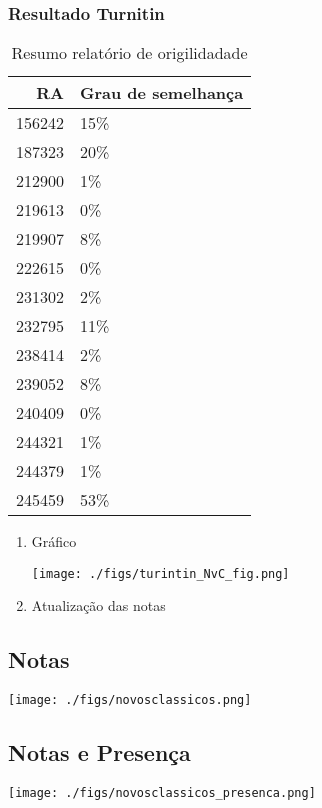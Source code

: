\documentclass[11pt]{article}
\begin{document}
\subsubsection{Resultado Turnitin}
\label{sec:org2e17c29}

\begin{table}[htbp]
\caption{\label{TurnitinNvC}Resumo relatório de origilidadade}
\centering
\begin{tabular}{rl}
\hline
RA & Grau de semelhança\\
\hline
156242 & 15\%\\
187323 & 20\%\\
212900 & 1\%\\
219613 & 0\%\\
219907 & 8\%\\
222615 & 0\%\\
231302 & 2\%\\
232795 & 11\%\\
238414 & 2\%\\
239052 & 8\%\\
240409 & 0\%\\
244321 & 1\%\\
244379 & 1\%\\
245459 & 53\%\\
\hline
\end{tabular}
\end{table}

\begin{enumerate}
\item Gráfico
\label{sec:org4d4c63e}
\begin{center}
\texttt{[image: ./figs/turintin\_NvC\_fig.png]}
\end{center}
\item Atualização das notas
\label{sec:orga78fe84}
\end{enumerate}


\subsection{Notas}
\label{sec:orge4e00ce}
\begin{center}
\texttt{[image: ./figs/novosclassicos.png]}
\end{center}
\subsection{Notas e Presença}
\label{sec:org28939e3}
\begin{center}
\texttt{[image: ./figs/novosclassicos\_presenca.png]}
\end{center}
\end{document}

